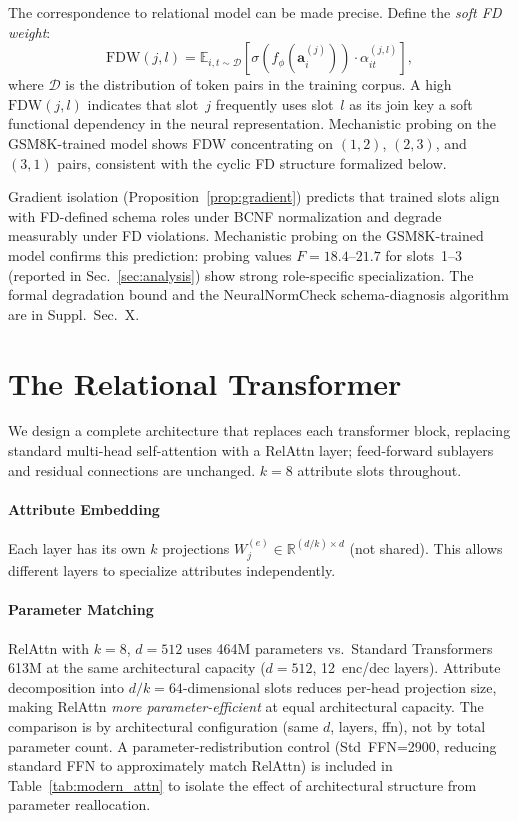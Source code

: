 \documentclass[conference]{IEEEtran}
\newcommand{\R}{\mathbb{R}}
\begin{document}
The correspondence to relational  model can be made precise. Define the \emph{soft FD weight}:
\begin{equation}
\mathrm{FDW}(j, l) = \mathbb{E}_{i,t \sim \mathcal{D}}\!\left[\sigma(f_\phi(\mathbf{a}^{(j)}_i)) \cdot \alpha_{it}^{(j,l)}\right],
\end{equation}
where $\mathcal{D}$ is the distribution of token pairs in the training corpus. A high $\mathrm{FDW}(j,l)$ indicates that slot~$j$ frequently uses slot~$l$ as its join key a soft functional dependency in the neural representation. Mechanistic probing on the GSM8K-trained model shows FDW concentrating on $(1,2)$, $(2,3)$, and $(3,1)$ pairs, consistent with the cyclic FD structure formalized below.

Gradient isolation (Proposition~\ref{prop:gradient}) predicts that trained slots align with FD-defined schema roles under BCNF normalization and degrade measurably under FD violations. Mechanistic probing on the GSM8K-trained model confirms this prediction: probing values $F = 18.4$--$21.7$ for slots~1--3 (reported in Sec.~\ref{sec:analysis}) show strong role-specific specialization. The formal degradation bound and the NeuralNormCheck schema-diagnosis algorithm are in Suppl.~Sec.~X.

\section{The Relational Transformer}
\label{sec:architecture}

We design a complete architecture that replaces each transformer block, replacing standard multi-head self-attention with a RelAttn layer; feed-forward sublayers and residual connections are unchanged. $k=8$ attribute slots throughout.

\paragraph{Attribute Embedding}
Each layer has its own $k$ projections $W_j^{(e)} \in \R^{(d/k) \times d}$ (not shared). This allows different layers to specialize attributes independently.

\paragraph{Parameter Matching}
RelAttn with $k{=}8$, $d{=}512$ uses 464M parameters vs.\ Standard Transformer\textquotesingle s 613M at the same architectural capacity ($d{=}512$, 12~enc/dec layers). Attribute decomposition into $d/k{=}64$-dimensional slots reduces per-head projection size, making RelAttn \emph{more parameter-efficient} at equal architectural capacity. The comparison is by architectural configuration (same $d$, layers, ffn), not by total parameter count. A parameter-redistribution control (Std~FFN=2900, reducing standard FFN to approximately match RelAttn) is included in Table~\ref{tab:modern_attn} to isolate the effect of architectural structure from parameter reallocation.
\end{document}
